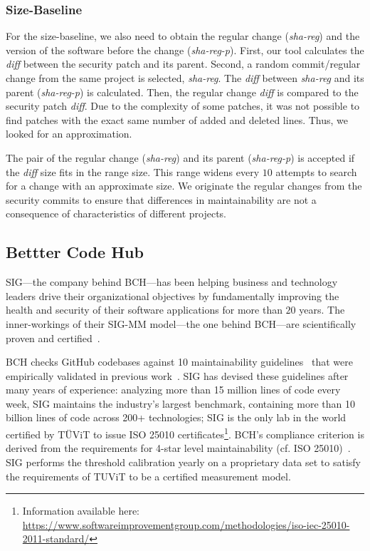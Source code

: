\documentclass[smallextended]{svjour3}       %
\begin{document}
\subsubsection{Size-Baseline} 

For the size-baseline, we also need to obtain the regular change (\emph{sha-reg})
and the version of the software before the change (\emph{sha-reg-p}). 
First, our tool calculates the \emph{diff}
between the security patch and its parent.
Second, a random commit/regular change from 
the same project is selected, \emph{sha-reg}. The 
\emph{diff} between \emph{sha-reg} and its parent (\emph{sha-reg-p})
is calculated. Then, the regular change \emph{diff} is compared 
to the security patch \emph{diff}.
Due to the complexity of some patches, it was not possible 
to find patches with the exact same number of added and deleted lines. 
Thus, we looked for an approximation.

The pair of the regular change (\emph{sha-reg}) and its parent (\emph{sha-reg-p}) is accepted if the 
\emph{diff} size fits in the range size. This range widens every 
$10$ attempts to search for a change with an approximate size. We 
originate the regular changes from the security commits to ensure 
that differences in maintainability are not a consequence of 
characteristics of different projects.


\subsection{Bettter Code Hub}

SIG---the company behind BCH---has been helping business and technology 
leaders drive their organizational objectives by fundamentally improving 
the health and security of their software applications for more than $20$ years. 
The inner-workings of their SIG-MM model---the one behind BCH---are 
scientifically proven and certified~\cite{4335232,5609747,6113040,baggen2012}.

BCH checks GitHub codebases against 10 maintainability 
guidelines~\cite{Visser:2016:OREILLY} that were empirically 
validated in previous work~\cite{Bijlsma:2012:FIR:2317098.2317124,8530041,8919169,8785997}.
SIG has devised these guidelines after many years of experience: analyzing more 
than 15 million lines of code every week, SIG maintains the industry’s largest 
benchmark, containing more than 10 billion lines of code across 200+ technologies; SIG 
is the only lab in the world certified by TÜViT to issue ISO 25010 certificates\footnote{Information available here: 
\url{https://www.softwareimprovementgroup.com/methodologies/iso-iec-25010-2011-standard/}}.
BCH's compliance criterion is derived from the requirements for 4-star 
level maintainability (cf. ISO 25010)~\cite{5609747,6113040,baggen2012,Visser:2016:OREILLY}.
SIG performs the threshold calibration
yearly on a proprietary data set to satisfy the requirements of TUViT to
be a certified measurement model.
\end{document}

